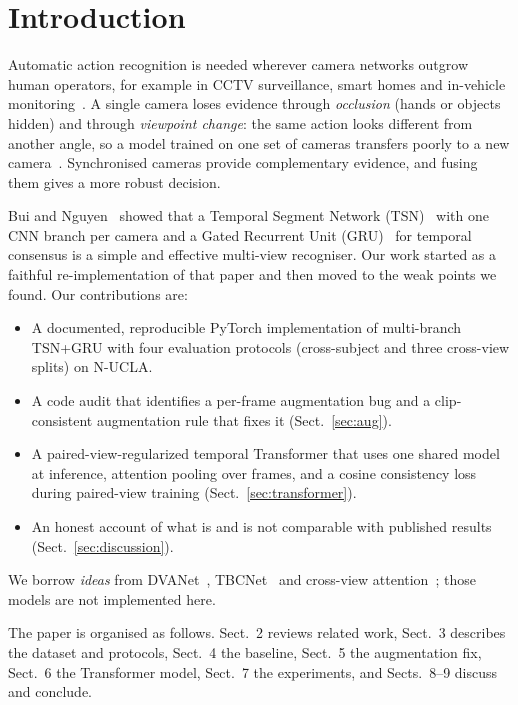 \documentclass[runningheads]{llncs}
\begin{document}
\section{Introduction}
Automatic action recognition is needed wherever camera networks outgrow human operators, for example in CCTV surveillance, smart homes and in-vehicle monitoring~\cite{veesam2025,ma2023}.
A single camera loses evidence through \emph{occlusion} (hands or objects hidden) and through \emph{viewpoint change}: the same action looks different from another angle, so a model trained on one set of cameras transfers poorly to a new camera~\cite{wang2018dana}.
Synchronised cameras provide complementary evidence, and fusing them gives a more robust decision.

Bui and Nguyen~\cite{bui2020} showed that a Temporal Segment Network (TSN)~\cite{wang2016tsn} with one CNN branch per camera and a Gated Recurrent Unit (GRU)~\cite{cho2014} for temporal consensus is a simple and effective multi-view recogniser.
Our work started as a faithful re-implementation of that paper and then moved to the weak points we found.
Our contributions are:
\begin{itemize}
\item A documented, reproducible PyTorch implementation of multi-branch TSN+GRU with four evaluation protocols (cross-subject and three cross-view splits) on N-UCLA.
\item A code audit that identifies a per-frame augmentation bug and a clip-consistent augmentation rule that fixes it (Sect.~\ref{sec:aug}).
\item A paired-view-regularized temporal Transformer that uses one shared model at inference, attention pooling over frames, and a cosine consistency loss during paired-view training (Sect.~\ref{sec:transformer}).
\item An honest account of what is and is not comparable with published results (Sect.~\ref{sec:discussion}).
\end{itemize}
We borrow \emph{ideas} from DVANet~\cite{siddiqui2024}, TBCNet~\cite{yang2026} and cross-view attention~\cite{nguyen2021}; those models are not implemented here.

The paper is organised as follows. Sect.~2 reviews related work, Sect.~3 describes the dataset and protocols, Sect.~4 the baseline, Sect.~5 the augmentation fix, Sect.~6 the Transformer model, Sect.~7 the experiments, and Sects.~8--9 discuss and conclude.
\end{document}
